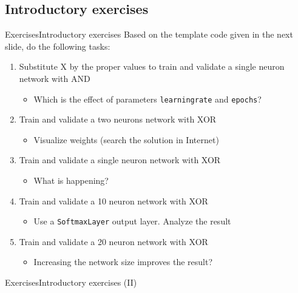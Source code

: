 \documentclass[10pt,compress]{beamer} %
\begin{document}
\subsection{Introductory exercises}
\begin{frame}{Exercises}{Introductory exercises}
	Based on the template code given in the next slide, do the following tasks:
	\begin{enumerate}
		\item Substitute X by the proper values to train and validate a single neuron network with AND
			\begin{itemize}
			\item Which is the effect of parameters \texttt{learningrate} and \texttt{epochs}?
			\end{itemize}
		\item Train and validate a two neurons network with XOR
			\begin{itemize}
			\item Visualize weights (search the solution in Internet)
			\end{itemize}
		\item Train and validate a single neuron network with XOR
			\begin{itemize}
			\item What is happening?
			\end{itemize}
		\item Train and validate a 10 neuron network with XOR
			\begin{itemize}
			\item Use a \texttt{SoftmaxLayer} output layer. Analyze the result
			\end{itemize}
		\item Train and validate a 20 neuron network with XOR
			\begin{itemize}
			\item Increasing the network size improves the result?
			\end{itemize}
	\end{enumerate}
\end{frame}

\begin{frame}{Exercises}{Introductory exercises (II)}
	\scriptsize{
    	\begin{block}{}
       \vspace{-0.2cm}
       
       \vspace{-0.2cm}
    	\end{block}
		}
\end{frame}
\end{document}
